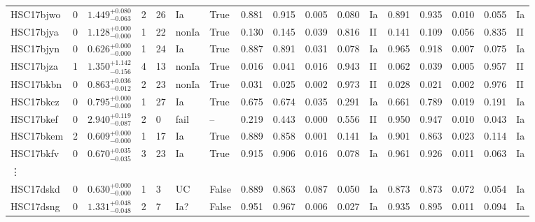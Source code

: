 \documentclass[proof]{pasj01}
\begin{document}
\begin{table}[htbp]
{\begin{tabular}{p{4.5em}p{1.2em}p{4.0em}p{2.1em}|p{0.6em}p{1.8em}p{3.0em}|p{2.9em}|p{1.2em}p{1.2em}p{1.2em}p{0.6em}|p{2.9em}|p{1.2em}p{1.2em}p{1.2em}p{0.6em}}
HSC17bjwo &     0 &    $1.449_{-0.063}^{+0.080}$ &         2 &   26 &     Ia &     True &    0.881 &    0.915 &    0.005 &    0.080 &      Ia &    0.891 &    0.935 &    0.010 &    0.055 &      Ia \\
HSC17bjya &     0 &    $1.128_{-0.000}^{+0.000}$ &         1 &   22 &  nonIa &     True &    0.130 &    0.145 &    0.039 &    0.816 &      II &    0.141 &    0.109 &    0.056 &    0.835 &      II \\
HSC17bjyn &     0 &    $0.626_{-0.000}^{+0.000}$ &         1 &   24 &     Ia &     True &    0.887 &    0.891 &    0.031 &    0.078 &      Ia &    0.965 &    0.918 &    0.007 &    0.075 &      Ia \\
HSC17bjza &     1 &    $1.350_{-0.156}^{+1.142}$ &         4 &   13 &  nonIa &     True &    0.016 &    0.041 &    0.016 &    0.943 &      II &    0.062 &    0.039 &    0.005 &    0.957 &      II \\
HSC17bkbn &     0 &    $0.863_{-0.012}^{+0.036}$ &         2 &   23 &  nonIa &     True &    0.031 &    0.025 &    0.002 &    0.973 &      II &    0.028 &    0.021 &    0.002 &    0.976 &      II \\
HSC17bkcz &     0 &    $0.795_{-0.000}^{+0.000}$ &         1 &   27 &     Ia &     True &    0.675 &    0.674 &    0.035 &    0.291 &      Ia &    0.661 &    0.789 &    0.019 &    0.191 &      Ia \\
HSC17bkef &     0 &    $2.940_{-0.087}^{+0.119}$ &         2 &    0 &   fail &    -- &    0.219 &    0.443 &    0.000 &    0.556 &      II &    0.950 &    0.947 &    0.010 &    0.043 &      Ia \\
HSC17bkem &     2 &    $0.609_{-0.000}^{+0.000}$ &         1 &   17 &     Ia &     True &    0.889 &    0.858 &    0.001 &    0.141 &      Ia &    0.901 &    0.863 &    0.023 &    0.114 &      Ia \\
HSC17bkfv &     0 &    $0.670_{-0.035}^{+0.035}$ &         3 &   23 &     Ia &     True &    0.915 &    0.906 &    0.016 &    0.078 &      Ia &    0.961 &    0.926 &    0.011 &    0.063 &      Ia \\
\vdots & & & & & & & & & & & & & & & &\\
HSC17dskd &     0 &    $0.630_{-0.000}^{+0.000}$ &         1 &    3 &  UC &   False &    0.889 &    0.863 &    0.087 &    0.050 &      Ia &    0.873 &    0.873 &    0.072 &    0.054 &      Ia \\
HSC17dsng &     0 &    $1.331_{-0.048}^{+0.048}$ &         2 &    7 &    Ia? &   False &    0.951 &    0.967 &    0.006 &    0.027 &      Ia &    0.935 &    0.895 &    0.011 &    0.094 &      Ia \\

\end{tabular}}
\end{table}
\end{document}
